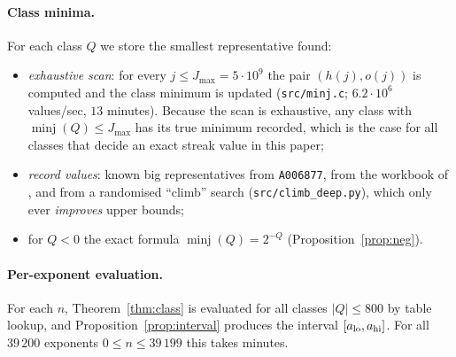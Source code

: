 \documentclass[11pt]{article}
\theoremstyle{remark}
\newcommand{\ooo}{o}
\newcommand{\hh}{h}
\begin{document}
\paragraph{Class minima.} For each class $Q$ we store the smallest representative found:
\begin{itemize}\itemsep2pt
\item \emph{exhaustive scan}: for every $j\le J_{\max}=5\cdot10^9$ the pair $(\hh(j),\ooo(j))$ is computed
and the class minimum is updated (\texttt{src/minj.c}; $6.2\cdot10^6$ values/sec, $13$ minutes).
Because the scan is exhaustive, any class with $\operatorname{minj}(Q)\le J_{\max}$ has its true
minimum recorded, which is the case for all classes that decide an exact streak value in this paper;
\item \emph{record values}: known big representatives from \texttt{A006877}, from the workbook of
\cite{frinkle2025}, and from a randomised ``climb'' search (\texttt{src/climb\_deep.py}), which only ever
\emph{improves} upper bounds;
\item for $Q<0$ the exact formula $\operatorname{minj}(Q)=2^{-Q}$ (Proposition~\ref{prop:neg}).
\end{itemize}

\paragraph{Per-exponent evaluation.} For each $n$, Theorem~\ref{thm:class} is evaluated for all classes
$|Q|\le800$ by table lookup, and Proposition~\ref{prop:interval} produces the interval $[a_{\rm lo},a_{\rm hi}]$.
For all $39\,200$ exponents $0\le n\le39\,199$ this takes minutes.
\end{document}
